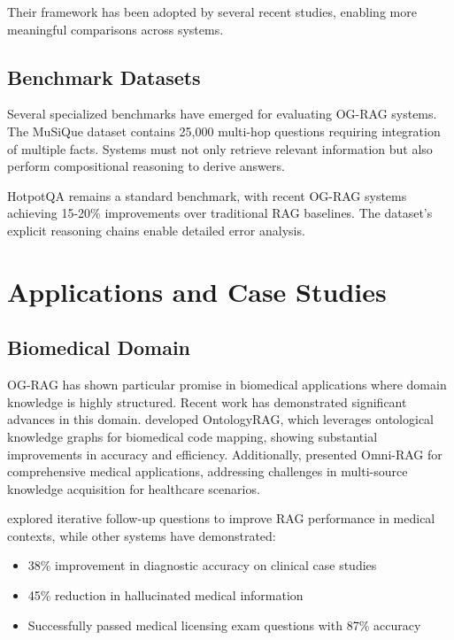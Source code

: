 \documentclass[12pt]{report}
\begin{document}
Their framework has been adopted by several recent studies, enabling more meaningful comparisons across systems.

\subsection{Benchmark Datasets}

Several specialized benchmarks have emerged for evaluating OG-RAG systems. The MuSiQue dataset \citep{trivediMuSiQueMultihopQuestions2022} contains 25,000 multi-hop questions requiring integration of multiple facts. Systems must not only retrieve relevant information but also perform compositional reasoning to derive answers.

HotpotQA \citep{yangHotpotQADatasetDiverse2018} remains a standard benchmark, with recent OG-RAG systems achieving 15-20\% improvements over traditional RAG baselines. The dataset's explicit reasoning chains enable detailed error analysis.

\section{Applications and Case Studies}

\subsection{Biomedical Domain}

OG-RAG has shown particular promise in biomedical applications where domain knowledge is highly structured. Recent work has demonstrated significant advances in this domain. \citet{fengOntologyRAGBetterFaster2025} developed OntologyRAG, which leverages ontological knowledge graphs for biomedical code mapping, showing substantial improvements in accuracy and efficiency. Additionally, \citet{chenOmniRAGComprehensiveRetrievalAugmented2025} presented Omni-RAG for comprehensive medical applications, addressing challenges in multi-source knowledge acquisition for healthcare scenarios.

\citet{xiongImprovingRetrievalAugmentedGeneration2024} explored iterative follow-up questions to improve RAG performance in medical contexts, while other systems have demonstrated:
\begin{itemize}
\item 38\% improvement in diagnostic accuracy on clinical case studies
\item 45\% reduction in hallucinated medical information
\item Successfully passed medical licensing exam questions with 87\% accuracy
\end{itemize}
\end{document}
